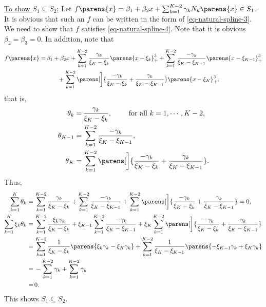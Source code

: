 \documentclass[12pt]{article}
\begin{document}
\begin{enumerate}[label=\textbf{\arabic*.}]
\begin{enumerate}
		\underline{To show $S_1 \subseteq S_2$:} Let $f \parens{x} = \beta_1 + \beta_2 x + \sum_{k=1}^{K-2} \gamma_k N_k \parens{x} \in S_1$. It is obvious that such an $f$ can be written in the form of \eqref{eq-natural-spline-3}. We need to show that $f$ satisfies \eqref{eq-natural-spline-4}. Note that it is obvious $\beta_2 = \beta_3 = 0$. In addition, note that 
		\begin{align*}
			f \parens{x} = & \, \beta_1 + \beta_2 x + \sum_{k=1}^{K-2} \frac{\gamma_k}{\xi_K - \xi_k} \parens{x - \xi_k}_+^3 + \sum_{k=1}^{K-2} \frac{-\gamma_k}{\xi_K - \xi_{K-1}} \parens{x - \xi_{K-1}}_+^3 \\ 
			& \qquad + \sum_{k=1}^{K-2} \parens[\bigg]{\frac{-\gamma_k}{\xi_K - \xi_k} + \frac{\gamma_k}{\xi_K - \xi_{K-1}}} \parens{x - \xi_K}_+^3, 
		\end{align*}
		that is, 
		\begin{align*}
			\theta_k = & \, \frac{\gamma_k}{\xi_K - \xi_k}, \qquad \text{ for all } k = 1, \cdots, K-2, \\ 
			\theta_{K-1} = & \, \sum_{k=1}^{K-2} \frac{-\gamma_k}{\xi_K - \xi_{K-1}}, \\ 
			\theta_K = & \, \sum_{k=1}^{K-2} \parens[\bigg]{\frac{-\gamma_k}{\xi_K - \xi_k} + \frac{\gamma_k}{\xi_K - \xi_{K-1}}}. 
		\end{align*}
		Thus, 
		\begin{align*}
			\sum_{k=1}^K \theta_k = & \, \sum_{k=1}^{K-2} \frac{\gamma_k}{\xi_K - \xi_k} + \sum_{k=1}^{K-2} \frac{-\gamma_k}{\xi_K - \xi_{K-1}} + \sum_{k=1}^{K-2} \parens[\bigg]{\frac{-\gamma_k}{\xi_K - \xi_k} + \frac{\gamma_k}{\xi_K - \xi_{K-1}}} = 0, \\ 
			\sum_{k=1}^K \xi_k \theta_k = & \, \sum_{k=1}^{K-2} \frac{\xi_k \gamma_k}{\xi_K - \xi_k} + \xi_{K-1} \sum_{k=1}^{K-2} \frac{-\gamma_k}{\xi_K - \xi_{K-1}} + \xi_K \sum_{k=1}^{K-2} \parens[\bigg]{ \frac{-\gamma_k}{\xi_K - \xi_k} + \frac{\gamma_k}{\xi_K - \xi_{K-1}}} \\ 
			= & \, \sum_{k=1}^{K-2} \frac{1}{\xi_K - \xi_k} \parens{\xi_k \gamma_k - \xi_K \gamma_k} + \sum_{k=1}^{K-2} \frac{1}{\xi_K - \xi_{K-1}} \parens{- \xi_{K-1} \gamma_k + \xi_K \gamma_k}  \\ 
			= & \, -\sum_{k=1}^{K-2} \gamma_k + \sum_{k=1}^{K-2} \gamma_k  \\ 
			= & \, 0. 
		\end{align*}
		This shows $S_1 \subseteq S_2$. 
		

\end{enumerate}
\end{enumerate}
\end{document}
